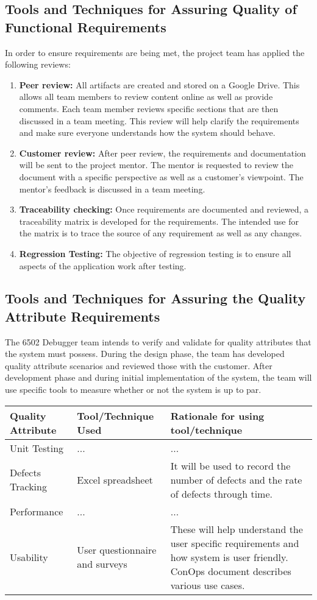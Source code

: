 \documentclass[a3paper, 11pt]{article}
\begin{document}
\subsection{Tools and Techniques for Assuring Quality of Functional Requirements}
In order to ensure requirements are being met, the project team has applied the following reviews:
\begin{enumerate}
	\item \textbf{Peer review:} All artifacts are created and stored on a Google Drive. This allows all team members to review content online as well as provide comments. Each team member reviews specific sections that are then discussed in a team meeting. This review will help clarify the requirements and make sure everyone understands how the system should behave. 
	\item \textbf{Customer review:} After peer review, the requirements and documentation will be sent to the project mentor. The mentor is requested to review the document with a specific perspective as well as a customer's viewpoint. The mentor's feedback is discussed in a team meeting. 
	\item \textbf{Traceability checking:} Once requirements are documented and reviewed, a traceability matrix is developed for the requirements. The intended use for the matrix is to trace the source of any requirement as well as any changes. 
	\item \textbf{Regression Testing:} The objective of regression testing is to ensure all aspects of the application work after testing. 
\end{enumerate}

\subsection{Tools and Techniques for Assuring the Quality Attribute Requirements}
The 6502 Debugger team intends to verify and validate for quality attributes that the system must possess. During the design phase, the team has developed quality attribute scenarios and reviewed those with the customer. After development phase and during initial implementation of the system, the team will use specific tools to measure whether or not the system is up to par. 
\begin{tabular} {|p{2cm}|p{5cm}|p{8.4cm}|}
	\hline
	\textbf{Quality Attribute} & \textbf{Tool/Technique Used} & \textbf{Rationale for using tool/technique} \\
	\hline
	Unit Testing & ... & ... \\ \hline
	Defects Tracking & Excel spreadsheet & It will be used to record the number of defects and the rate of defects through time. \\ \hline
	Performance & ... & ... \\ \hline
	Usability & User questionnaire and surveys & These will help understand the user specific requirements and how system is user friendly. ConOps document describes various use cases.\\ \hline 	
\end{tabular}
\par
\end{document}
